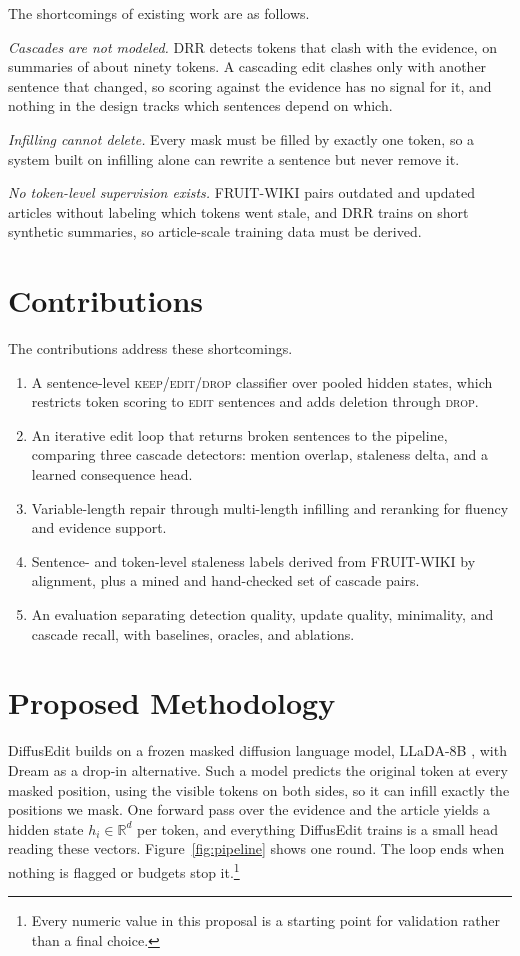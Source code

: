 \documentclass[11pt]{article}
\newcommand{\keep}{\textsc{keep}}
\newcommand{\edit}{\textsc{edit}}
\newcommand{\drop}{\textsc{drop}}
\begin{document}
The shortcomings of existing work are as follows.

\emph{Cascades are not modeled.} DRR detects tokens that clash with the evidence, on summaries of about ninety tokens. A cascading edit clashes only with another sentence that changed, so scoring against the evidence has no signal for it, and nothing in the design tracks which sentences depend on which.

\emph{Infilling cannot delete.} Every mask must be filled by exactly one token, so a system built on infilling alone can rewrite a sentence but never remove it.

\emph{No token-level supervision exists.} FRUIT-WIKI pairs outdated and updated articles without labeling which tokens went stale, and DRR trains on short synthetic summaries, so article-scale training data must be derived.

\section{Contributions}
\label{sec:contributions}

The contributions address these shortcomings.

\begin{enumerate}[label=(\alph*)]
\item A sentence-level \keep{}/\edit{}/\drop{} classifier over pooled hidden states, which restricts token scoring to \edit{} sentences and adds deletion through \drop{}.
\item An iterative edit loop that returns broken sentences to the pipeline, comparing three cascade detectors: mention overlap, staleness delta, and a learned consequence head.
\item Variable-length repair through multi-length infilling and reranking for fluency and evidence support.
\item Sentence- and token-level staleness labels derived from FRUIT-WIKI by alignment, plus a mined and hand-checked set of cascade pairs.
\item An evaluation separating detection quality, update quality, minimality, and cascade recall, with baselines, oracles, and ablations.
\end{enumerate}

\section{Proposed Methodology}
\label{sec:method}

DiffusEdit builds on a frozen masked diffusion language model, LLaDA-8B \citep{nie-etal-2025-llada}, with Dream \citep{ye-etal-2025-dream} as a drop-in alternative. Such a model predicts the original token at every masked position, using the visible tokens on both sides, so it can infill exactly the positions we mask. One forward pass over the evidence and the article yields a hidden state $h_i \in \mathbb{R}^d$ per token, and everything DiffusEdit trains is a small head reading these vectors. Figure~\ref{fig:pipeline} shows one round. The loop ends when nothing is flagged or budgets stop it.\footnote{Every numeric value in this proposal is a starting point for validation rather than a final choice.}
\end{document}
